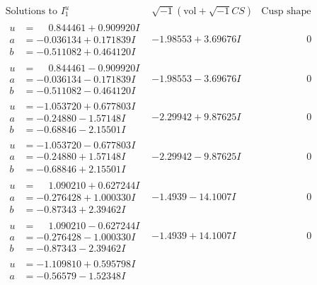 \documentclass[1p]{elsarticle_modified}
\theoremstyle{definition}
\newcommand{\I}{\sqrt{-1}}
\begin{document}
$$\begin{array}{c|c|c}
\text{Solutions to }I^u_{1}& \I (\text{vol} + \sqrt{-1}CS) & \text{Cusp shape}\\
 \hline 
\begin{aligned}
u &= \phantom{-}0.844461 + 0.909920 I \\
a &= -0.036134 + 0.171839 I \\
b &= -0.511082 + 0.464120 I\end{aligned}
 & -1.98553 + 3.69676 I & \phantom{-0.000000 } 0 \\ \hline\begin{aligned}
u &= \phantom{-}0.844461 - 0.909920 I \\
a &= -0.036134 - 0.171839 I \\
b &= -0.511082 - 0.464120 I\end{aligned}
 & -1.98553 - 3.69676 I & \phantom{-0.000000 } 0 \\ \hline\begin{aligned}
u &= -1.053720 + 0.677803 I \\
a &= -0.24880 - 1.57148 I \\
b &= -0.68846 - 2.15501 I\end{aligned}
 & -2.29942 + 9.87625 I & \phantom{-0.000000 } 0 \\ \hline\begin{aligned}
u &= -1.053720 - 0.677803 I \\
a &= -0.24880 + 1.57148 I \\
b &= -0.68846 + 2.15501 I\end{aligned}
 & -2.29942 - 9.87625 I & \phantom{-0.000000 } 0 \\ \hline\begin{aligned}
u &= \phantom{-}1.090210 + 0.627244 I \\
a &= -0.276428 + 1.000330 I \\
b &= -0.87343 + 2.39462 I\end{aligned}
 & -1.4939 - 14.1007 I & \phantom{-0.000000 } 0 \\ \hline\begin{aligned}
u &= \phantom{-}1.090210 - 0.627244 I \\
a &= -0.276428 - 1.000330 I \\
b &= -0.87343 - 2.39462 I\end{aligned}
 & -1.4939 + 14.1007 I & \phantom{-0.000000 } 0 \\ \hline\begin{aligned}
u &= -1.109810 + 0.595798 I \\
a &= -0.56579 - 1.52348 I \\

\end{aligned}
\end{array}$$
\end{document}
